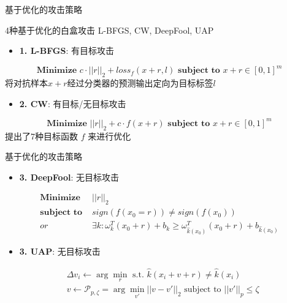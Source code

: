 \begin{frame}{基于优化的攻击策略}

    4种基于优化的白盒攻击 L-BFGS, CW, DeepFool, UAP
    \begin{itemize}
        \item \textbf{1. L-BFGS}: 有目标攻击
    \end{itemize}
    \begin{equation}
        \textbf{Minimize } c \cdot ||r||_2 + loss_f(x+r,l) \textbf{ subject to } x+r \in [0,1]^m
    \end{equation}
    将对抗样本$x+r$经过分类器的预测输出定向为目标标签$l$

    \begin{itemize}
        \item \textbf{2. CW}: 有目标/无目标攻击
    \end{itemize}  
    \begin{equation}
        \textbf{Minimize } ||r||_2 + c \cdot f(x+r) \textbf{ subject to } x+r \in [0,1]^m
    \end{equation}
    提出了7种目标函数 $f$ 来进行优化

    
\end{frame}

\begin{frame}{基于优化的攻击策略}
    \begin{itemize}
        \item \textbf{3. DeepFool}: 无目标攻击
    \end{itemize}    
    \begin{equation}
        \begin{aligned}
            \textbf{Minimize }  & ||r||_2 \\
            \textbf{subject to }& sign(f(x_0=r))\neq sign(f(x_0)) \\
            or                  & \exists k:\omega_k^T(x_0+r)+b_k \geq \omega_{\hat{k}(x_0)}^T(x_0+r)+b_{\hat{k}(x_0)}
        \end{aligned}
    \end{equation}



    \begin{itemize}
        \item \textbf{3. UAP}: 无目标攻击
    \end{itemize}       
    \begin{equation}
        \begin{aligned}
            & \Delta v_i \leftarrow \arg\min\limits_{r} \text{ s.t. } \hat{k}(x_i+v+r)\neq \hat{k}(x_i) \\
            & v \leftarrow \mathcal{P}_{p,\zeta}=\arg\min\limits_{v'} ||v-v'||_2 \text{ subject to } ||v'||_p\leq \zeta
        \end{aligned}
    \end{equation}
\end{frame}